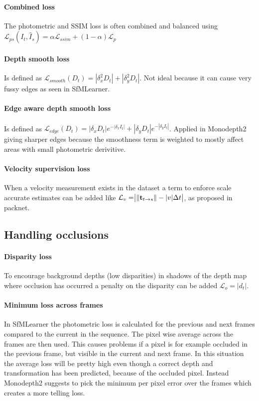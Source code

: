 \paragraph{Combined loss} The photometric and SSIM loss is often combined and balanced using $ \mathcal{L}_{ps}(I_t, \hat{I}_s) = \alpha \mathcal{L}_{ssim} + (1-\alpha) \mathcal{L}_p $

\paragraph{Depth smooth loss} Is defined as $ \mathcal{L}_{smooth}(D_t)=|\delta_x^2 D_t|+|\delta_y^2 D_t| $. Not ideal because it can cause very fussy edges as seen in SfMLearner.

\paragraph{Edge aware depth smooth loss} Is defined as $ \mathcal{L}_{edge}(D_t)=|\delta_x D_t|e^{-|\delta_x I_t|} + |\delta_y D_t|e^{-|\delta_y I_t|} $. Applied in Monodepth2 giving sharper edges because the smoothness term is weighted to mostly affect areas with small photometric derivitive.

\paragraph{Velocity supervision loss} When a velocity measurement exists in the dataset a term to enforce scale accurate estimates can be added like $ \mathcal{L}_{v} = \bigr{|} \| \textbf{t}_{t \rightarrow s} \| - |v|\Delta t \bigr{|} $, as proposed in packnet\cite{packnet}.

\subsection{Handling occlusions}
\label{sec:occlusion}

\paragraph{Disparity loss} To encourage background depths (low disparities) in shadows of the depth map where occlusion has occurred a penalty on the disparity can be added $ \mathcal{L}_{o} =|d_t|. $

\paragraph{Minimum loss across frames} In SfMLearner the photometric loss is calculated for the previous and next frames compared to the current in the sequence. The pixel wise average across the frames are then used. This causes problems if a pixel is for example occluded in the previous frame, but visible in the current and next frame. In this situation the average loss will be pretty high even though a correct depth and transformation has been predicted, because of the occluded pixel. Instead Monodepth2 suggests to pick the minimum per pixel error over the frames which creates a more telling loss. 

